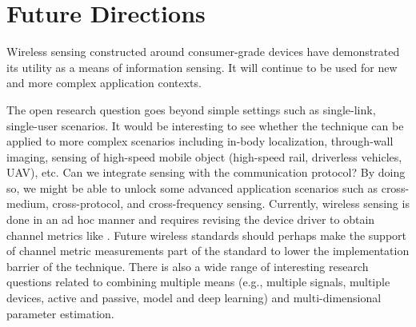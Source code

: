 \section{Future Directions}

Wireless sensing constructed around consumer-grade devices have demonstrated its utility as a means of information sensing. It will
continue to be used for new and more complex application contexts.

The open research question goes beyond simple settings such as single-link, single-user scenarios. It would be interesting to see whether
the technique can be applied to more complex scenarios including in-body localization, through-wall imaging, sensing of high-speed mobile
object (high-speed rail, driverless vehicles, UAV), etc. Can we integrate sensing with the communication protocol? By doing so, we might be
able to unlock some advanced application scenarios such as cross-medium, cross-protocol, and cross-frequency sensing. Currently, wireless
sensing is done in an ad hoc manner and requires revising the device driver to obtain channel metrics like \CSI. Future wireless standards
should perhaps make the support of channel metric measurements part of the standard to lower the implementation barrier of the technique.
There is also a wide range of interesting research questions related to combining multiple means (e.g., multiple signals, multiple devices,
active and passive, model and deep learning) and multi-dimensional parameter estimation.
